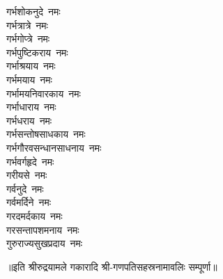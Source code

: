 \begin{multicols}{2}
\begin{flushleft}
गर्भशोकनुदे~नमः\\
गर्भत्रात्रे~नमः\\
गर्भगोप्त्रे~नमः\\
गर्भपुष्टिकराय~नमः\\
गर्भाश्रयाय~नमः\\
गर्भमयाय~नमः\\
गर्भामयनिवारकाय~नमः\\
गर्भाधाराय~नमः\hfill{}\\
गर्भधराय~नमः\\
गर्भसन्तोषसाधकाय~नमः\\
गर्भगौरवसन्धानसाधनाय~नमः\\
गर्भवर्गहृदे~नमः\\
गरीयसे~नमः\\
गर्वनुदे~नमः\\
गर्वमर्दिने~नमः\\
गरदमर्दकाय~नमः\\
गरसन्तापशमनाय~नमः\\
गुरुराज्यसुखप्रदाय~नमः\hfill{}\\
\end{flushleft}
\end{multicols}
\centerline{॥इति श्रीरुद्रयामले गकारादि श्री-गणपतिसहस्रनामावलिः सम्पूर्णा॥}
